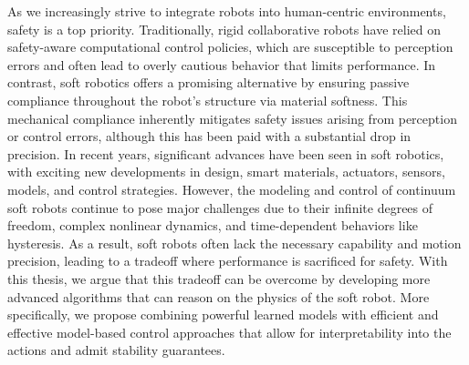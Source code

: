 As we increasingly strive to integrate robots into human-centric environments, safety is a top priority. Traditionally, rigid collaborative robots have relied on safety-aware computational control policies, which are susceptible to perception errors and often lead to overly cautious behavior that limits performance. In contrast, soft robotics offers a promising alternative by ensuring passive compliance throughout the robot’s structure via material softness. This mechanical compliance inherently mitigates safety issues arising from perception or control errors, although this has been paid with a substantial drop in precision. In recent years, significant advances have been seen in soft robotics, with exciting new developments in design, smart materials, actuators, sensors, models, and control strategies. However, the modeling and control of continuum soft robots continue to pose major challenges due to their infinite degrees of freedom, complex nonlinear dynamics, and time-dependent behaviors like hysteresis. As a result, soft robots often lack the necessary capability and motion precision, leading to a tradeoff where performance is sacrificed for safety. With this thesis, we argue that this tradeoff can be overcome by developing more advanced algorithms that can reason on the physics of the soft robot. More specifically, we propose combining powerful learned models with efficient and effective model-based control approaches that allow for interpretability into the actions and admit stability guarantees.

